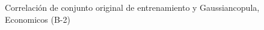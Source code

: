 \begin{figure}[H]
    \centering
    
    \caption{Correlación de conjunto original de entrenamiento y Gaussiancopula, Economicos (B-2)}
    \label{pairwise-economicos-b-2-gaussiancopula}
\end{figure}